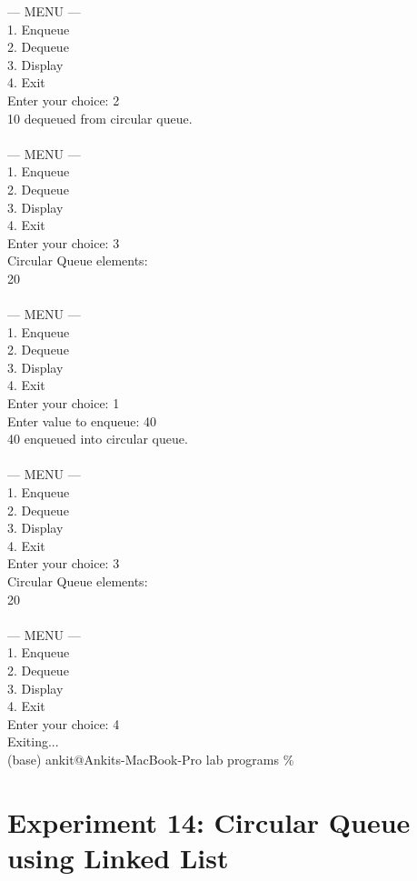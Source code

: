 \documentclass[12pt,a4paper]{article}
\begin{document}
\begin{tcolorbox}[terminalstyle, title=Sample Output]
{--- MENU ---\\
1. Enqueue\\
2. Dequeue\\
3. Display\\
4. Exit\\
Enter your choice: 2\\
10 dequeued from circular queue.\\
\\
--- MENU ---\\
1. Enqueue\\
2. Dequeue\\
3. Display\\
4. Exit\\
Enter your choice: 3\\
Circular Queue elements:\\
20 \\
\\
--- MENU ---\\
1. Enqueue\\
2. Dequeue\\
3. Display\\
4. Exit\\
Enter your choice: 1\\
Enter value to enqueue: 40\\
40 enqueued into circular queue.\\
\\
--- MENU ---\\
1. Enqueue\\
2. Dequeue\\
3. Display\\
4. Exit\\
Enter your choice: 3\\
Circular Queue elements:\\
20  \\
\\
--- MENU ---\\
1. Enqueue\\
2. Dequeue\\
3. Display\\
4. Exit\\
Enter your choice: 4\\
Exiting...\\
(base) ankit@Ankits-MacBook-Pro lab programs \%
}
\end{tcolorbox}

\newpage
\section*{Experiment 14: Circular Queue using Linked List}
\end{document}
